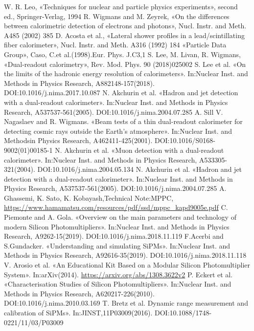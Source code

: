 \documentclass[a4paper,11pt,titlepage,oneside,openright]{book}	%
\begin{document}
\begin{backmatter}
\begin{thebibliography}{99}
			  W. R. Leo, «Techniques for nuclear and particle physics experiments»,  second ed., Springer-Verlag, 1994
			 R.  Wigmans  and  M.  Zeyrek, «On  the  differences  between  calorimetric  detection  of electrons and photons», Nucl. Instr. and Meth. A485 (2002) 385
			 D. Acosta et al., «Lateral shower profiles in a lead/scintillating fiber calorimeter», Nucl. Instr. and Meth. A316 (1992) 184
			 «Particle Data Group», Caso, C.et al.(1998).Eur. Phys. J.C3,1
			 S. Lee, M. Livan, R. Wigmans, «Dual-readout calorimetry», Rev. Mod. Phys. 90 (2018)025002
			 S. Lee et al. «On the limits of the hadronic energy resolution of calorimeters». In:Nuclear Inst. and Methods in Physics Research, A882148-157(2018).  DOI:10.1016/j.nima.2017.10.087
			 N. Akchurin et al. «Hadron and jet detection with a dual-readout calorimeter». In:Nuclear Inst. and Methods in Physics Research, A537537-561(2005).  DOI:10.1016/j.nima.2004.07.285
			 A. Sill V. Nagaslaev and R. Wigmans. «Beam tests of a thin dual-readout calorimeter for detecting cosmic rays outside the Earth’s atmosphere». In:Nuclear Inst. and Methodsin Physics Research, A462411-425(2001).  DOI:10.1016/S0168-9002(01)00185-1
			 N. Akchurin et al. «Muon detection with a dual-readout calorimeter». In:Nuclear Inst. and Methods in Physics Research, A533305-321(2004).  DOI:10.1016/j.nima.2004.05.134
			 N. Akchurin et al. «Hadron and jet detection with a dual-readout calorimeter». In:Nuclear Inst. and Methods in Physics Research, A537537-561(2005).  DOI:10.1016/j.nima.2004.07.285
			 A. Ghassemi, K. Sato, K. Kobayash,Technical Note:MPPC, 
			\url{https://www.hamamatsu.com/resources/pdf/ssd/mppc_kapd9005e.pdf}
			 C. Piemonte and A. Gola. «Overview on the main parameters and technology of modern Silicon Photomultipliers». In:Nuclear Inst. and Methods in Physics Research, A9262-15(2019).    DOI:10.1016/j.nima.2018.11.119
			 F.Acerbi and S.Gundacker. «Understanding and simulating SiPMs». In:Nuclear Inst. and Methods in Physics Research, A92616-35(2019).    DOI:10.1016/j.nima.2018.11.118
			 V. Arosio et al. «An Educational Kit Based on a Modular Silicon Photomultiplier System». In:arXiv(2014). 
			\url{https://arxiv.org/abs/1308.3622v2}
			 P. Eckert et al. «Characterisation Studies of Silicon Photomultipliers». In:Nuclear Inst. and Methods in Physics Research, A620217-226(2010).    DOI:10.1016/j.nima.2010.03.169
			 T. Bretz et al.  Dynamic range measurement and calibration of SiPMs». In:JINST,11P03009(2016).    DOI:10.1088/1748-0221/11/03/P03009
			

\end{thebibliography}
\end{backmatter}
\end{document}
